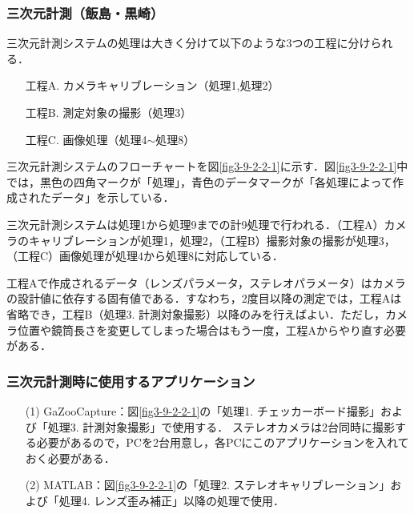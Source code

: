 \newpage
\subsubsection{三次元計測（飯島・黒崎）}
三次元計測システムの処理は大きく分けて以下のような3つの工程に分けられる．
\begin{itemize}
	\item[工程A.] カメラキャリブレーション（処理1,処理2）
	\item[工程B.] 測定対象の撮影（処理3）
	\item[工程C.] 画像処理（処理4$\sim$処理8）
\end{itemize}

三次元計測システムのフローチャートを図\ref{fig3-9-2-2-1}に示す．図\ref{fig3-9-2-2-1}中では，黒色の四角マークが「処理」，青色のデータマークが「各処理によって作成されたデータ」を示している．

三次元計測システムは処理1から処理9までの計9処理で行われる．（工程A）カメラのキャリブレーションが処理1，処理2，（工程B）撮影対象の撮影が処理3，（工程C）画像処理が処理4から処理8に対応している．

\vspace{2ex}
工程Aで作成されるデータ（レンズパラメータ，ステレオパラメータ）はカメラの設計値に依存する固有値である．すなわち，2度目以降の測定では，工程Aは省略でき，工程B（処理3. 計測対象撮影）以降のみを行えばよい．ただし，カメラ位置や鏡筒長さを変更してしまった場合はもう一度，工程Aからやり直す必要がある．

\subsubsection*{三次元計測時に使用するアプリケーション}
\begin{itemize}
	\item[(1)] GaZooCapture：図\ref{fig3-9-2-2-1}の「処理1. チェッカーボード撮影」および「処理3. 計測対象撮影」で使用する．
	ステレオカメラは2台同時に撮影する必要があるので，PCを2台用意し，各PCにこのアプリケーションを入れておく必要がある．
	
	\item[(2)] MATLAB：図\ref{fig3-9-2-2-1}の「処理2. ステレオキャリブレーション」および「処理4. レンズ歪み補正」以降の処理で使用．
\end{itemize}

